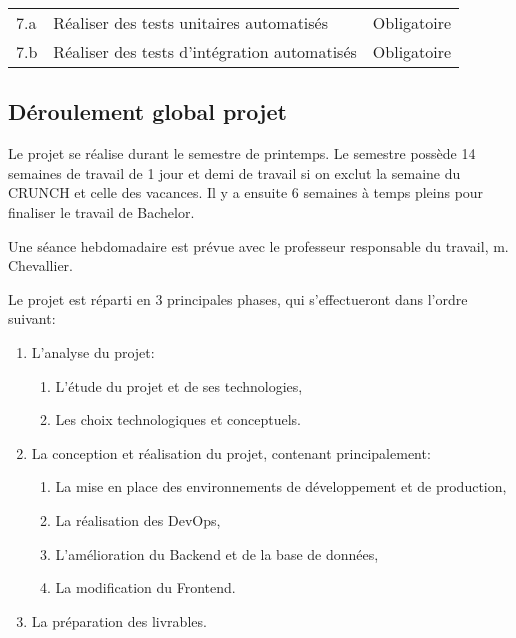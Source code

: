 \documentclass[
    iai, %
    il, %
]{heig-tb}
\begin{document}
\begin{table}[h]
\begin{center}
\begin{tabularx}{1.0\textwidth} {
                | >{\centering\arraybackslash}X
                | >{\centering\arraybackslash}X
                | >{\centering\arraybackslash}X |}
            7.a & Réaliser des tests unitaires automatisés                                                                               & Obligatoire   \\
            7.b & Réaliser des tests d'intégration automatisés                                                                           & Obligatoire   \\
        \end{tabularx}
    \end{center}
\end{table}

\newpage
\subsection{Déroulement global projet}

Le projet se réalise durant le semestre de printemps. Le semestre possède 14 semaines de travail de 1 jour et demi de travail si on exclut la semaine du CRUNCH et celle des vacances.
Il y a ensuite 6 semaines à temps pleins pour finaliser le travail de Bachelor.

Une séance hebdomadaire est prévue avec le professeur responsable du travail, m. Chevallier.

Le projet est réparti en 3 principales phases, qui s'effectueront dans l'ordre suivant:
\begin{enumerate}
    \def\labelenumi{\arabic{enumi}.}
    \item L'analyse du projet:
          \begin{enumerate}
              \def\labelenumii{\alph{enumii}.}
              \item L'étude du projet et de ses technologies,
              \item Les choix technologiques et conceptuels.
          \end{enumerate}
    \item La conception et réalisation du projet, contenant principalement:
          \begin{enumerate}
              \def\labelenumii{\alph{enumii}.}
              \item La mise en place des environnements de développement et de production,
              \item La réalisation des DevOps,
              \item L'amélioration du Backend et de la base de données,
              \item La modification du Frontend.
          \end{enumerate}
    \item La préparation des livrables.
\end{enumerate}
\end{document}
